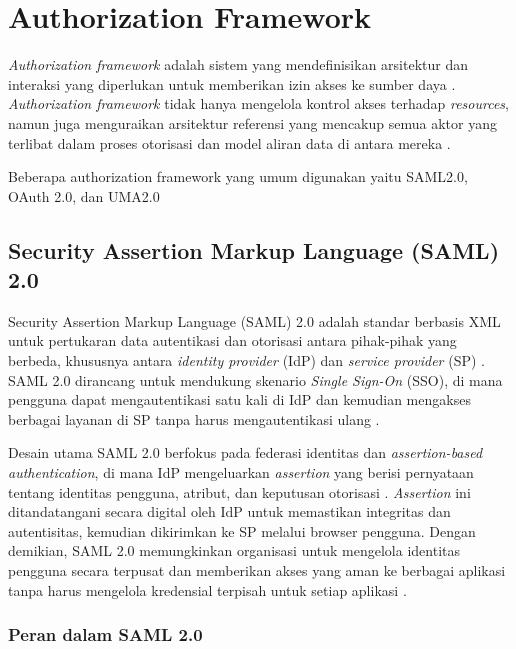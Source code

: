 \section{Authorization Framework}\label{subsec:authorization-framework-2}

\textit{Authorization framework} adalah sistem yang mendefinisikan arsitektur dan interaksi yang diperlukan untuk memberikan izin akses ke sumber daya \autocite{CONRAD2023295}.
\textit{Authorization framework} tidak hanya mengelola kontrol akses terhadap \textit{resources}, namun juga menguraikan arsitektur referensi yang mencakup semua aktor yang terlibat dalam proses otorisasi dan model aliran data di antara mereka \autocite{jaimeauthorizationmodels}.

Beberapa authorization framework yang umum digunakan yaitu SAML2.0, OAuth 2.0, dan UMA2.0 \autocite{jaimandeepauthframework, termontuma}

\subsection{Security Assertion Markup Language (SAML) 2.0}

Security Assertion Markup Language (SAML) 2.0 adalah standar berbasis XML untuk pertukaran data autentikasi dan otorisasi antara pihak-pihak yang berbeda, khususnya antara \textit{identity provider} (IdP) dan \textit{service provider} (SP) \autocite{samlspec}.
SAML 2.0 dirancang untuk mendukung skenario \textit{Single Sign-On} (SSO), di mana pengguna dapat mengautentikasi satu kali di IdP dan kemudian mengakses berbagai layanan di SP tanpa harus mengautentikasi ulang \autocite{CONRAD2023295}.

Desain utama SAML 2.0 berfokus pada federasi identitas dan \textit{assertion-based authentication}, di mana IdP mengeluarkan \textit{assertion} yang berisi pernyataan tentang identitas pengguna, atribut, dan keputusan otorisasi \autocite{samlspec}.
\textit{Assertion} ini ditandatangani secara digital oleh IdP untuk memastikan integritas dan autentisitas, kemudian dikirimkan ke SP melalui browser pengguna.
Dengan demikian, SAML 2.0 memungkinkan organisasi untuk mengelola identitas pengguna secara terpusat dan memberikan akses yang aman ke berbagai aplikasi tanpa harus mengelola kredensial terpisah untuk setiap aplikasi \autocite{CONRAD2023295}.

\subsubsection{Peran dalam SAML 2.0}\label{subsubsec:peran-saml}


